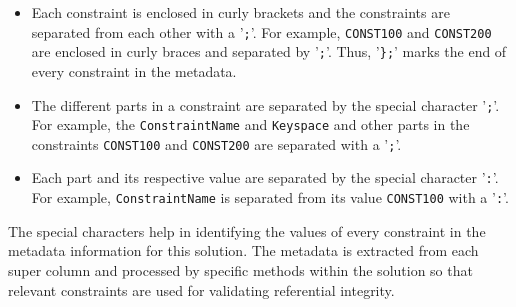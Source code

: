 		\begin{itemize}
			\item Each constraint is enclosed in curly brackets and the
			constraints are separated from each other with a
			'\texttt{;}'.  For example,  \texttt{CONST100} and \texttt{CONST200} are
			enclosed in curly braces and separated by '\texttt{;}'. 
			Thus,  '\texttt{\};}' marks the end of every constraint in the metadata. 
		
		
			\item The different parts in a constraint are separated by the special character
			'\texttt{;}'.  For example,  the \texttt{ConstraintName} and \texttt{Keyspace}
			and other parts in the constraints \texttt{CONST100} and \texttt{CONST200} are
			separated with a '\texttt{;}'.
			 
			 
			\item Each part and its respective value are separated by the special
			character '\texttt{:}'.  For example,  \texttt{ConstraintName} is separated from
			its value \texttt{CONST100} with a '\texttt{:}'.  
			
		\end{itemize}

The special characters help in identifying the values of every constraint in the
metadata information for this solution.  The metadata is extracted from each
super column and processed by specific methods within the solution so that
relevant constraints are used for validating referential integrity.  


